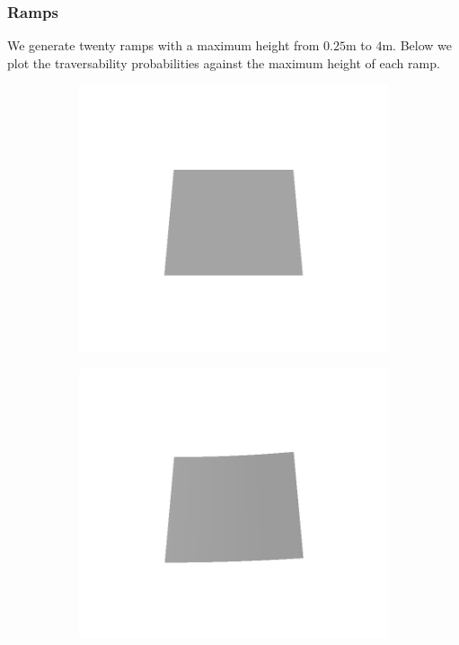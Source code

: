 \subsubsection{Ramps}
We generate twenty ramps with a maximum height from $0.25$m to $4$m. Below we plot the traversability probabilities against the maximum height of each ramp.

\begin{figure}[H]
    \centering
    \begin{subfigure}[b]{0.24\textwidth}
    \includegraphics[width=\linewidth]{../img/5/custom_patches/ramp/all/00-3d.png}
    \end{subfigure}
    \begin{subfigure}[b]{0.24\textwidth}
    \includegraphics[width=\linewidth]{../img/5/custom_patches/ramp/all/03-3d.png}

\end{subfigure}
\end{figure}
